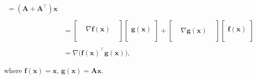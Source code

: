 \documentclass[12pt,thmsa]{article}
\begin{document}
\begin{itemize}
\[\begin{aligned}
		  	= \left( \mathbf{A} + \mathbf{A}^{\top} \right) \boldsymbol{x}
		\\
		& \\
		& = \left[
			\begin{array}{ccc}  & &\\ &  \nabla \boldsymbol{f}(\boldsymbol{x}) & \\  & & \\  \end{array}
			\right]
		{\left[ \begin{array}{c} \\  \boldsymbol{g}(\boldsymbol{x}) \\ \\ \end{array} \right]} +
			\left[
			\begin{array}{ccc} & &\\ & \nabla \boldsymbol{g}(\boldsymbol{x}) & \\ & & \end{array}
			\right]
		{\left[ \begin{array}{c} \\ \boldsymbol{f}(\boldsymbol{x}) \\ \\ \end{array} \right]} \\
		& \\
		& = \nabla \Big(\boldsymbol{f}(\boldsymbol{x})^{\top} \boldsymbol{g}(\boldsymbol{x})\Big),
	\end{aligned} \]
	
	where \(\boldsymbol{f}(\boldsymbol{x})=\boldsymbol{x}\), \(\boldsymbol{g}(\boldsymbol{x})=\mathbf{A}\boldsymbol{x} \).
\end{itemize}
\end{document}
